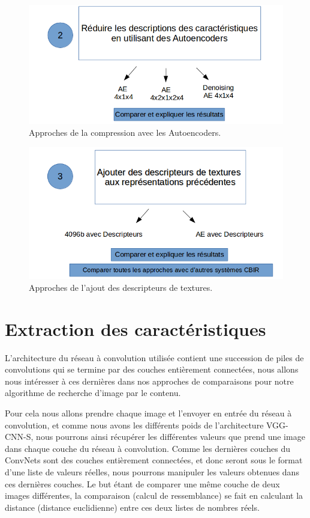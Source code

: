 	\begin{figure}[H]
	\centering
		\includegraphics[width=5in]{Figures/diagramme2.png}
	\caption[An Electron]{Approches de la compression avec les Autoencoders.}
	\label{fig:Electron}
\end{figure} 

	\begin{figure}[H]
	\centering
		\includegraphics[width=6in]{Figures/diagramme3.png}
	\caption[An Electron]{Approches de l'ajout des descripteurs de textures.}
	\label{fig:Electron}
\end{figure} 

\section{Extraction des caractéristiques}
	L'architecture du réseau à convolution utilisée contient une succession de piles de convolutions qui se termine par des couches entièrement connectées, nous allons nous intéresser à ces dernières dans nos approches de comparaisons pour notre algorithme de recherche d'image par le contenu.

	Pour cela nous allons prendre chaque image et l'envoyer en entrée du réseau à convolution, et comme nous avons les différents poids de l'architecture VGG-CNN-S, nous pourrons ainsi récupérer les différentes valeurs que prend une image dans chaque couche du réseau à convolution. Comme les dernières couches du ConvNets sont des couches entièrement connectées, et donc seront sous le format d'une liste de valeurs réelles, nous pourrons manipuler les valeurs obtenues dans ces dernières couches. Le but étant de comparer une même couche de deux images différentes, la comparaison (calcul de ressemblance) se fait en calculant la distance (distance euclidienne) entre ces deux listes de nombres réels.
	
